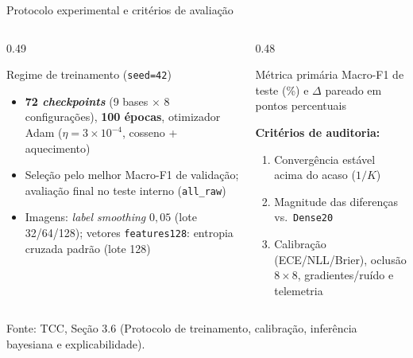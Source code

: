 \documentclass[aspectratio=169,11pt,brazil]{beamer}
\newcommand{\fonte}[1]{\par\vfill{\tiny\color{gray}Fonte: #1\par}}
\begin{document}
\begin{frame}{Protocolo experimental e critérios de avaliação}
  \begin{columns}[T]
    \begin{column}{0.49\textwidth}
      \begin{block}{Regime de treinamento (\texttt{seed=42})}
        \begin{itemize}\small
          \item \textbf{72 \textit{checkpoints}} (9 bases $\times$ 8 configurações), \textbf{100 épocas}, otimizador Adam ($\eta = 3\times 10^{-4}$, cosseno + aquecimento)
          \item Seleção pelo melhor Macro-F1 de validação; avaliação final no teste interno (\texttt{all\_raw})
          \item Imagens: \textit{label smoothing} $0{,}05$ (lote 32/64/128); vetores \texttt{features128}: entropia cruzada padrão (lote 128)
        \end{itemize}
      \end{block}
    \end{column}
    \begin{column}{0.48\textwidth}
      \begin{block}{Métrica primária}
        Macro-F1 de teste (\%) e $\Delta$ pareado em pontos percentuais
      \end{block}
      \vspace{4pt}
      \textbf{Critérios de auditoria:}
      \begin{enumerate}\small
        \item Convergência estável acima do acaso ($1/K$)
        \item Magnitude das diferenças vs.\ \texttt{Dense20}
        \item Calibração (ECE/NLL/Brier), oclusão $8\times 8$, gradientes/ruído e telemetria
      \end{enumerate}
    \end{column}
  \end{columns}
  \fonte{TCC, Seção 3.6 (Protocolo de treinamento, calibração, inferência bayesiana e explicabilidade).}
\end{frame}
\end{document}
